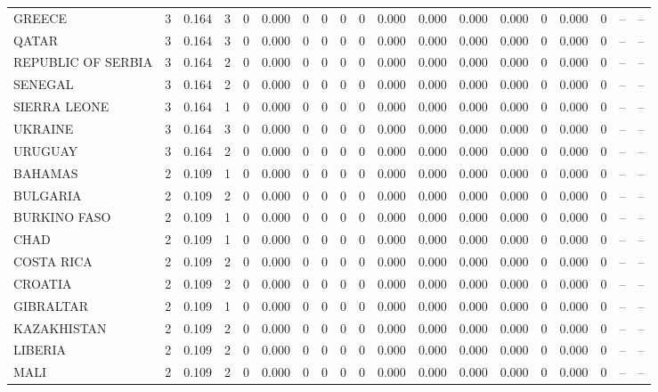 \begin{tabular}{lrrrrrrrrrrrrrrrrrr}
GREECE & 3 & 0.164 & 3 & 0 & 0.000 & 0 & 0 & 0 & 0 & 0.000 & 0.000 & 0.000 & 0.000 & 0 & 0.000 & 0 & -- & -- \\
QATAR & 3 & 0.164 & 3 & 0 & 0.000 & 0 & 0 & 0 & 0 & 0.000 & 0.000 & 0.000 & 0.000 & 0 & 0.000 & 0 & -- & -- \\
REPUBLIC OF SERBIA & 3 & 0.164 & 2 & 0 & 0.000 & 0 & 0 & 0 & 0 & 0.000 & 0.000 & 0.000 & 0.000 & 0 & 0.000 & 0 & -- & -- \\
SENEGAL & 3 & 0.164 & 2 & 0 & 0.000 & 0 & 0 & 0 & 0 & 0.000 & 0.000 & 0.000 & 0.000 & 0 & 0.000 & 0 & -- & -- \\
SIERRA LEONE & 3 & 0.164 & 1 & 0 & 0.000 & 0 & 0 & 0 & 0 & 0.000 & 0.000 & 0.000 & 0.000 & 0 & 0.000 & 0 & -- & -- \\
UKRAINE & 3 & 0.164 & 3 & 0 & 0.000 & 0 & 0 & 0 & 0 & 0.000 & 0.000 & 0.000 & 0.000 & 0 & 0.000 & 0 & -- & -- \\
URUGUAY & 3 & 0.164 & 2 & 0 & 0.000 & 0 & 0 & 0 & 0 & 0.000 & 0.000 & 0.000 & 0.000 & 0 & 0.000 & 0 & -- & -- \\
BAHAMAS & 2 & 0.109 & 1 & 0 & 0.000 & 0 & 0 & 0 & 0 & 0.000 & 0.000 & 0.000 & 0.000 & 0 & 0.000 & 0 & -- & -- \\
BULGARIA & 2 & 0.109 & 2 & 0 & 0.000 & 0 & 0 & 0 & 0 & 0.000 & 0.000 & 0.000 & 0.000 & 0 & 0.000 & 0 & -- & -- \\
BURKINO FASO & 2 & 0.109 & 1 & 0 & 0.000 & 0 & 0 & 0 & 0 & 0.000 & 0.000 & 0.000 & 0.000 & 0 & 0.000 & 0 & -- & -- \\
CHAD & 2 & 0.109 & 1 & 0 & 0.000 & 0 & 0 & 0 & 0 & 0.000 & 0.000 & 0.000 & 0.000 & 0 & 0.000 & 0 & -- & -- \\
COSTA RICA & 2 & 0.109 & 2 & 0 & 0.000 & 0 & 0 & 0 & 0 & 0.000 & 0.000 & 0.000 & 0.000 & 0 & 0.000 & 0 & -- & -- \\
CROATIA & 2 & 0.109 & 2 & 0 & 0.000 & 0 & 0 & 0 & 0 & 0.000 & 0.000 & 0.000 & 0.000 & 0 & 0.000 & 0 & -- & -- \\
GIBRALTAR & 2 & 0.109 & 1 & 0 & 0.000 & 0 & 0 & 0 & 0 & 0.000 & 0.000 & 0.000 & 0.000 & 0 & 0.000 & 0 & -- & -- \\
KAZAKHISTAN & 2 & 0.109 & 2 & 0 & 0.000 & 0 & 0 & 0 & 0 & 0.000 & 0.000 & 0.000 & 0.000 & 0 & 0.000 & 0 & -- & -- \\
LIBERIA & 2 & 0.109 & 2 & 0 & 0.000 & 0 & 0 & 0 & 0 & 0.000 & 0.000 & 0.000 & 0.000 & 0 & 0.000 & 0 & -- & -- \\
MALI & 2 & 0.109 & 2 & 0 & 0.000 & 0 & 0 & 0 & 0 & 0.000 & 0.000 & 0.000 & 0.000 & 0 & 0.000 & 0 & -- & -- \\

\end{tabular}

